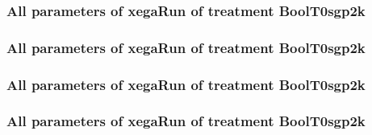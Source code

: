 \documentclass[18pt,c]{beamer}
\begin{document}

 \begin{frame}
 \fontsize{8pt}{9pt}\selectfont
 \frametitle{  All parameters of xegaRun of treatment BoolT0sgp2k 
 }

 \label{ExpBtParmTable102.tex}  
 \end{frame}


 \begin{frame}
 \fontsize{8pt}{9pt}\selectfont
 \frametitle{  All parameters of xegaRun of treatment BoolT0sgp2k 
 }

 \label{ExpBtParmTable103.tex}  
 \end{frame}


 \begin{frame}
 \fontsize{8pt}{9pt}\selectfont
 \frametitle{  All parameters of xegaRun of treatment BoolT0sgp2k 
 }

 \label{ExpBtParmTable104.tex}  
 \end{frame}


 \begin{frame}
 \fontsize{8pt}{9pt}\selectfont
 \frametitle{  All parameters of xegaRun of treatment BoolT0sgp2k 
 }

 \label{ExpBtParmTable105.tex}  
 \end{frame}

\end{document}
